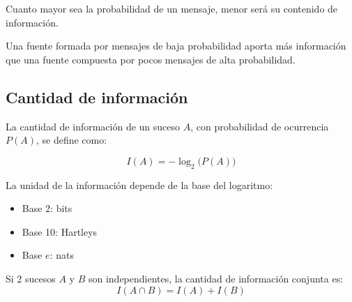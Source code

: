 \documentclass[11pt,a4paper]{article}
\begin{document}
\begin{NotaBox}
Cuanto mayor sea la probabilidad de un mensaje, menor será su contenido de información.

Una fuente formada por mensajes de baja probabilidad aporta más información que una fuente compuesta por pocos mensajes de alta probabilidad.
\end{NotaBox}

\subsection{Cantidad de información}

La cantidad de información de un suceso $A$, con probabilidad de ocurrencia $P(A)$, se define como:

\[
I(A) = - \log_{2}\!\big(P(A)\big)
\]

La unidad de la información depende de la base del logaritmo:
\begin{itemize}
	\item Base 2: bits
	\item Base 10: Hartleys
	\item Base $e$: nats
\end{itemize}

Si 2 sucesos $A$ y $B$ son independientes, la cantidad de información conjunta es:
\[
I(A \cap B) = I(A) + I(B)
\]
\end{document}

